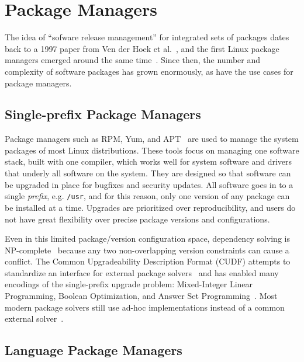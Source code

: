 \section{Package Managers}
\label{sec:package-managers}

The idea of ``sofware release management'' for integrated sets of packages dates back to
a 1997 paper from Ven der Hoek et al.~\cite{van1997software}, and the first Linux
package managers emerged around the same time~\cite{rpm,apt}. Since then, the number and
complexity of software packages has grown enormously, as have the use cases for package
managers.

\subsection{Single-prefix Package Managers}

Package managers such as RPM, Yum, and APT~\cite{foster+:rpm03,silva:apt01,yum} are used
to manage the system packages of most Linux distributions. These tools focus on managing
one software stack, built with one compiler, which works well for system software and
drivers that underly all software on the system. They are designed so that software can
be upgraded in place for bugfixes and security updates. All software goes in to a single
{\it prefix}, e.g. {\tt /usr}, and for this reason, only one version of any package can
be installed at a time. Upgrades are prioritized over reproducibility, and users do not
have great flexibility over precise package versions and configurations.

Even in this limited package/version configuration space, dependency solving is
NP-complete~\cite{dicosmo:edos,mancinelli+:ase06-foss-distros} because any two
non-overlapping version constraints can cause a conflict. The Common Upgradeability
Description Format (CUDF) attempts to standardize an interface for external package
solvers~\cite{abate2012dependency,abate-2013-modular-package-manager} and has enabled
many encodings of the single-prefix upgrade problem: Mixed-Integer Linear Programming,
Boolean Optimization, and Answer Set
Programming~\cite{tucker+:icse07-opium,michel+:lococo2010,argelich+:lococo2010,gebser+:2011-aspcud}.
Most modern package solvers still use ad-hoc implementations instead of a common
external solver~\cite{abate2020dependency}.

\subsection{Language Package Managers}

